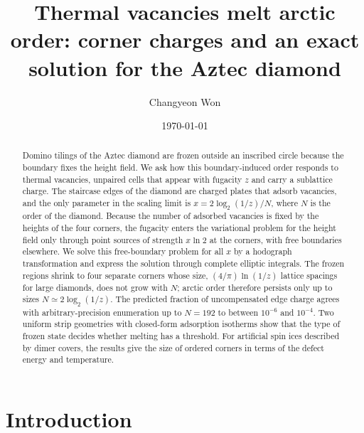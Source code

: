 \documentclass[reprint,aps,pre,superscriptaddress,longbibliography,floatfix,amsmath,amssymb]{revtex4-2}
\begin{document}
\title{Thermal vacancies melt arctic order: corner charges and an exact solution for the Aztec diamond}

\author{Changyeon Won}

\date{\today}

\begin{abstract}
Domino tilings of the Aztec diamond are frozen outside an inscribed circle because the boundary fixes the height field. We ask how this boundary-induced order responds to thermal vacancies, unpaired cells that appear with fugacity $z$ and carry a sublattice charge. The staircase edges of the diamond are charged plates that adsorb vacancies, and the only parameter in the scaling limit is $x=2\log_2(1/z)/N$, where $N$ is the order of the diamond. Because the number of adsorbed vacancies is fixed by the heights of the four corners, the fugacity enters the variational problem for the height field only through point sources of strength $x\ln 2$ at the corners, with free boundaries elsewhere. We solve this free-boundary problem for all $x$ by a hodograph transformation and express the solution through complete elliptic integrals. The frozen regions shrink to four separate corners whose size, $(4/\pi)\ln(1/z)$ lattice spacings for large diamonds, does not grow with $N$; arctic order therefore persists only up to sizes $N\simeq 2\log_2(1/z)$. The predicted fraction of uncompensated edge charge agrees with arbitrary-precision enumeration up to $N=192$ to between $10^{-6}$ and $10^{-4}$. Two uniform strip geometries with closed-form adsorption isotherms show that the type of frozen state decides whether melting has a threshold. For artificial spin ices described by dimer covers, the results give the size of ordered corners in terms of the defect energy and temperature.
\end{abstract}

\maketitle

\section{Introduction}\label{sec:intro}
\end{document}
